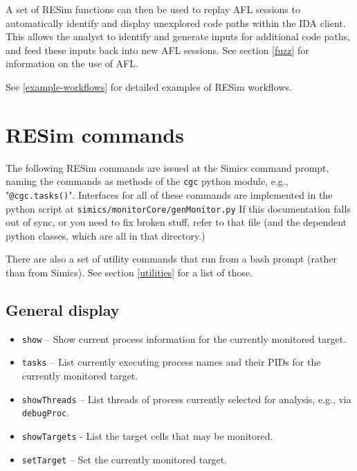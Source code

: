 \documentclass[titlepage]{article}
\begin{document}
A set of RESim functions can then be used to replay AFL sessions to automatically identify and display unexplored code paths within
the IDA client.  This allows the analyst to identify and generate inputs for additional code paths, and feed these inputs back into 
new AFL sessions.  See section \ref{fuzz} for information on the use of AFL.

See \ref{example-workflows} for detailed examples of RESim workflows.


\section{RESim commands}
\label{commands}
The following RESim commands are issued at the Simics command prompt, naming the commands as methods of the {\tt cgc} python module,
e.g., "{\tt @cgc.tasks()}".  Interfaces for all of these commands are implemented in the python script at {\tt simics/monitorCore/genMonitor.py}
If this documentation falls out of sync, or you need to fix broken stuff, refer to that file (and the dependent python classes, which are all in that directory.)

There are also a set of utility commands that run from a bash prompt (rather than from Simics).  See section \ref{utilities} for a list of those.

\label{commands}
\subsection{General display}
\begin{itemize}
\item {\tt show} -- Show current process information for the currently monitored target.
\item {\tt tasks} -- List currently executing process names and their PIDs for the currently monitored target.
\item {\tt showThreads} -- List threads of process currently selected for analysis, e.g., via {\tt debugProc}.
\item {\tt showTargets} - List the target cells that may be monitored.
\item {\tt setTarget} -- Set the currently monitored target.
\end{itemize}
\end{document}
